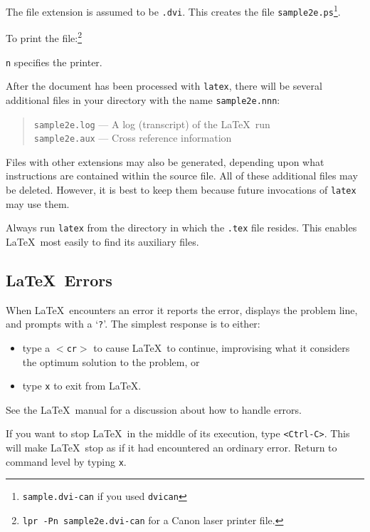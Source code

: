 \documentclass[11pt,twoside,nolof]{starlink}
\begin{document}
The file extension is assumed to be \texttt{.dvi}.
This creates the file \texttt{sample2e.ps}\footnote{\texttt{sample.dvi-can}
if you used \texttt{dvican}}.

To print the file:\footnote{\texttt{lpr -Pn sample2e.dvi-can} for a Canon laser
printer file.}
\begin{terminalv}
\end{terminalv}

\texttt{n} specifies the printer.

After the document has been processed with \texttt{latex},
there will be several additional files
in your directory with the name \texttt{sample2e.nnn}:
\begin{quote}
  \texttt{sample2e.log} --- A log (transcript) of the \LaTeX\ run\\
  \texttt{sample2e.aux} --- Cross reference information
\end{quote}

Files with other extensions may also be generated, depending upon what
instructions are contained within the source file.
All of these additional files may be deleted. However, it is best to keep them
because future invocations of \texttt{latex} may use them.

Always run \texttt{latex} from the directory in which the \texttt{.tex} file
resides. This enables \LaTeX\ most easily to find its auxiliary files.

\subsection{\LaTeX\ Errors}
\label{se:latexerrs}

When \LaTeX\ encounters an error it reports the error, displays the problem
line, and prompts with a `\texttt{?}'.
The simplest response is to either:

\begin{itemize}
  \item type a \texttt{$<$cr$>$} to cause \LaTeX\ to continue,
        improvising what it considers the optimum solution to the problem, or
  \item type \texttt{x} to exit from \LaTeX.
\end{itemize}

See the \LaTeX\ manual\cite[sections 2.3 and 2.4 and Chapter 8]{lamport}
for a discussion about how to handle errors.

If you want to stop \LaTeX\ in the middle of its execution,
type \texttt{<Ctrl-C>}. This will make \LaTeX\ stop as if it
had encountered an ordinary error. Return to command level by typing \texttt{x}.
\end{document}
